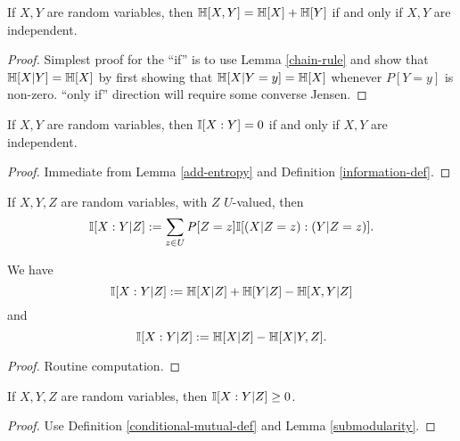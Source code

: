 \begin{lemma}\label{add-entropy}
  \leanok
  If $X,Y$ are random variables, then $\mathbb{H}[X,Y] = \mathbb{H}[X] + \mathbb{H}[Y]$ if and only if $X,Y$ are independent.
\end{lemma}

\begin{proof}  Simplest proof for the ``if'' is to use Lemma \ref{chain-rule} and show that $\mathbb{H}[X|Y] = \mathbb{H}[X]$ by first showing that $\mathbb{H}[X|Y=y] = \mathbb{H}[X]$ whenever $P[Y=y]$ is non-zero.  ``only if'' direction will require some converse Jensen.
\end{proof}


\begin{corollary}
\label{vanish-entropy}
\leanok
If $X,Y$ are random variables, then $\mathbb{I}[X:Y] = 0$ if and only if $X,Y$ are independent.
\end{corollary}

\begin{proof} \leanok Immediate from Lemma \ref{add-entropy} and Definition \ref{information-def}.
\end{proof}

\begin{definition}
\label{conditional-mutual-def}
\leanok
If $X,Y,Z$ are random variables, with $Z$ $U$-valued, then
$$ \mathbb{I}[X:Y|Z] := \sum_{z \in U} P[Z=z] \mathbb{I}[(X|Z=z): (Y|Z=z)].$$
\end{definition}

\begin{lemma}
  \label{conditional-mutual-alt}
  \leanok
We have
  $$ \mathbb{I}[X:Y|Z] := \mathbb{H}[X|Z] + \mathbb{H}[Y|Z] - \mathbb{H}[X,Y|Z]$$
and
  $$ \mathbb{I}[X:Y|Z] := \mathbb{H}[X|Z] - \mathbb{H}[X|Y,Z].$$
\end{lemma}

\begin{proof} Routine computation.
\end{proof}

\begin{lemma}
\label{conditional-nonneg}
\leanok
If $X,Y,Z$ are random variables, then $\mathbb{I}[X:Y|Z] \ge 0$.
\end{lemma}
\begin{proof}
\leanok
Use Definition \ref{conditional-mutual-def} and Lemma \ref{submodularity}.
\end{proof}

